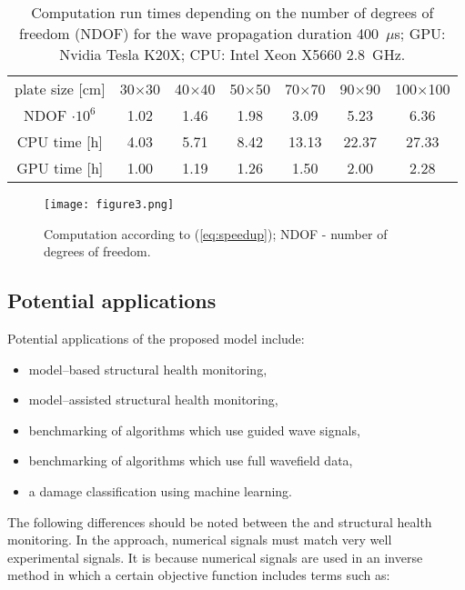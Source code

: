 \begin{table}
\caption{Computation run times depending on the number of degrees of freedom (NDOF) for the wave propagation duration 400~\(\mu\)s; GPU: Nvidia Tesla K20X; CPU: Intel Xeon X5660 2.8~GHz.}
	\begin{indented}
	\item[]	\begin{tabular}{ccccccc} 	
		\toprule	
		plate size [cm] & 30\(\times\)30  & 40\(\times\)40 & 50\(\times\)50 & 70\(\times\)70 & 90\(\times\)90 & 100\(\times\)100 \\
		NDOF \(\cdot 10^6\) & 1.02  & 1.46 & 1.98 & 3.09 & 5.23 & 6.36 \\
		\midrule
		CPU time [h]& 4.03& 5.71 & 8.42 & 13.13 & 22.37 & 27.33\\
		\midrule
		GPU time [h]& 1.00& 1.19 & 1.26 & 1.50 & 2.00 & 2.28\\
		\bottomrule 
	\end{tabular} 
\end{indented}
	\label{tab:run_time}
\end{table}

\begin{figure} [h!]
	\centering
\texttt{[image: figure3.png]}
\caption{Computation   according to (\ref{eq:speedup});  NDOF - number of degrees of freedom.}
	\label{fig:speed-up}
\end{figure}

\subsection{Potential applications}

Potential applications of the proposed model include:
\begin{itemize}
	\item model--based structural health monitoring,
	\item model--assisted structural health monitoring,
	\item benchmarking of algorithms which use guided wave signals,
	\item benchmarking of algorithms which use full wavefield data,
	\item a damage classification using machine learning.
\end{itemize}
The following differences should be noted between the   and   structural health monitoring.
In the   approach, numerical signals must match very well experimental signals. It is because numerical signals are used in an inverse method in which a certain objective function includes terms such as:

